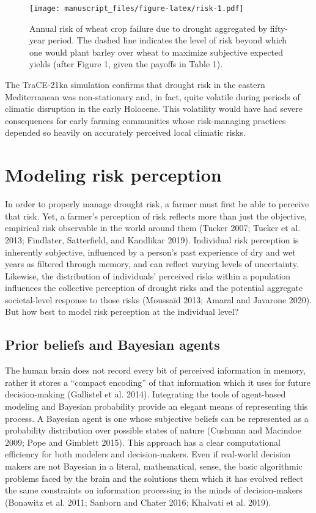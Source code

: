 \documentclass[smallextended]{svjour3}       %
\begin{document}
\begin{figure}
\centering
\texttt{[image: manuscript\_files/figure-latex/risk-1.pdf]}
\caption{\label{fig:risk}Annual risk of wheat crop failure due to drought aggregated by fifty-year period. The dashed line indicates the level of risk beyond which one would plant barley over wheat to maximize subjective expected yields (after Figure 1, given the payoffs in Table 1).}
\end{figure}

The TraCE-21ka simulation confirms that drought risk in the eastern Mediterranean was non-stationary and, in fact, quite volatile during periods of climatic disruption in the early Holocene. This volatility would have had severe consequences for early farming communities whose risk-managing practices depended so heavily on accurately perceived local climatic risks.

\hypertarget{sec:3}{%
\section{Modeling risk perception}\label{sec:3}}

In order to properly manage drought risk, a farmer must first be able to perceive that risk. Yet, a farmer's perception of risk reflects more than just the objective, empirical risk observable in the world around them (Tucker 2007; Tucker et al. 2013; Findlater, Satterfield, and Kandlikar 2019). Individual risk perception is inherently subjective, influenced by a person's past experience of dry and wet years as filtered through memory, and can reflect varying levels of uncertainty. Likewise, the distribution of individuals' perceived risks within a population influences the collective perception of drought risks and the potential aggregate societal-level response to those risks (Moussaïd 2013; Amaral and Javarone 2020). But how best to model risk perception at the individual level?

\hypertarget{prior-beliefs-and-bayesian-agents}{%
\subsection{Prior beliefs and Bayesian agents}\label{prior-beliefs-and-bayesian-agents}}

The human brain does not record every bit of perceived information in memory, rather it stores a ``compact encoding'' of that information which it uses for future decision-making (Gallistel et al. 2014). Integrating the tools of agent-based modeling and Bayesian probability provide an elegant means of representing this process. A Bayesian agent is one whose subjective beliefs can be represented as a probability distribution over possible states of nature (Cushman and Macindoe 2009; Pope and Gimblett 2015). This approach has a clear computational efficiency for both modelers and decision-makers. Even if real-world decision makers are not Bayesian in a literal, mathematical, sense, the basic algorithmic problems faced by the brain and the solutions them which it has evolved reflect the same constraints on information processing in the minds of decision-makers (Bonawitz et al. 2011; Sanborn and Chater 2016; Khalvati et al. 2019).
\end{document}
